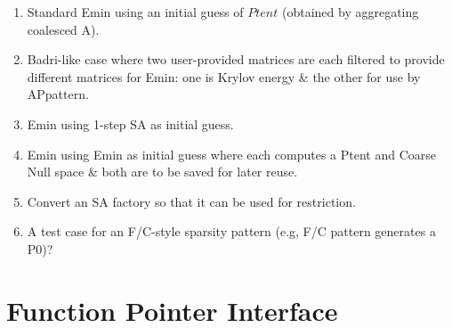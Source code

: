 \documentclass{siamltex}
\numberwithin{algorithm}{section}  %
\begin{document}
\begin{enumerate}
      \setcounter{enumi}{\value{enumi_saved}}
\item Standard Emin using an initial guess of $Ptent$ (obtained by aggregating
   coalesced A).\\
\item Badri-like case where two user-provided matrices are each filtered
      to provide different matrices for Emin: one is Krylov
      energy \& the other for use by APpattern.\\
\item Emin using 1-step SA as initial guess.\\

\item Emin using Emin as initial guess where each computes a Ptent and Coarse Null space \& both are to be saved for later reuse.\\

\item Convert an SA factory so that it can be used for restriction.\\

\item A test case for an F/C-style sparsity pattern (e.g,
      F/C pattern generates a P0)?

\end{enumerate}
\section{Function Pointer Interface}
\end{document}
